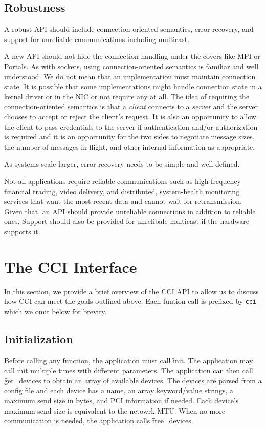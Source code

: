 \documentclass[conference]{IEEEtran}
\begin{document}
\subsection{Robustness}
A robust API should include connection-oriented semantics, error recovery, and support for
unreliable communications including multicast.

A new API should not hide the connection handling under the covers like MPI or Portals.
As with sockets, using connection-oriented semantics is familiar and well understood. We
do not mean that an implementation must maintain connection state. It is possible that
some implementations might handle connection state in a kernel driver or in the NIC or not
require any at all. The idea of requiring the connection-oriented semantics is that a
\emph{client} connects to a \emph{server} and the server chooses to accept or reject the
client's request. It is also an opportunity to allow the client to pass credentials to the
server if authentication and/or authorization is required and it is an opportunity for the
two sides to negotiate message sizes, the number of messages in flight, and other internal
information as appropriate.

As systems scale larger, error recovery needs to be simple and well-defined.

Not all applications require reliable communications such as high-frequency financial
trading, video delivery, and distributed, system-health monitoring services that want the
most recent data and cannot wait for retransmission. Given that, an API should provide
unreliable connections in addition to reliable ones. Support should also be provided for
unrelibale multicast if the hardware supports it.

\section{The CCI Interface}
In this section, we provide a brief overview of the CCI API to allow us to discuss how CCI
can meet the goals outlined above. Each funtion call is prefixed by \texttt{cci\_} which
we omit below for brevity.

\subsection{Initialization}

Before calling any function, the application must call \f{init}. The application
may call init multiple times with different parameters. The application can then call
\f{get\_devices} to obtain an array of available devices. The devices are parsed
from a config file and each device has a name, an array keyword/value strings, a maximum
send size in bytes, and PCI information if needed. Each device's maximum send size is
equivalent to the netowrk MTU. When no more communication is needed, the application calls
\f{free\_devices}.
\end{document}

